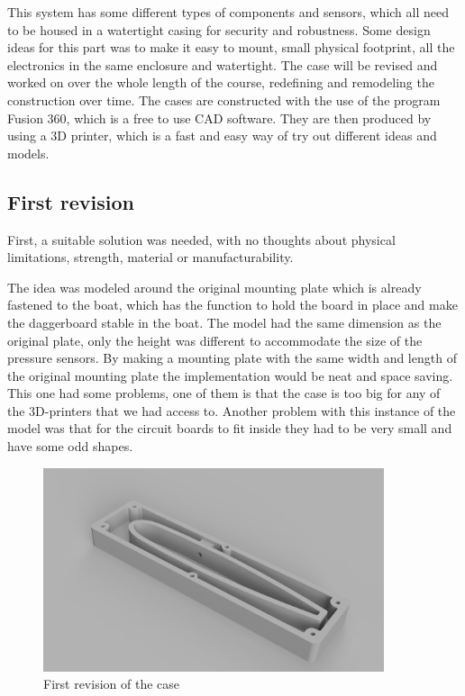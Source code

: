 
This system has some different types of components and sensors, which all need to be housed in a watertight casing for security and robustness. Some design ideas for this part was to make it easy to mount, small physical footprint, all the electronics in the same enclosure and watertight.  
The case will be revised and worked on over the whole length of the course, redefining and remodeling the construction over time.  
The cases are constructed with the use of the program Fusion 360, which is a free to use CAD software. They are then produced by using a 3D printer, which is a fast and easy way of try out different ideas and models.   

\subsection{First revision}
First, a suitable solution was needed, with no thoughts about physical limitations, strength, material or manufacturability.  

The idea was modeled around the original mounting plate which is already fastened to the boat, which has the function to hold the board in place and make the daggerboard stable in the boat. The model had the same dimension as the original plate, only the height was different to accommodate the size of the pressure sensors. By making a mounting plate with the same width and length of the original mounting plate the implementation would be neat and space saving. 
This one had some problems, one of them is that the case is too big for any of the 3D-printers that we had access to. Another problem with this instance of the model was that for the circuit boards to fit inside they had to be very small and have some odd shapes.  



\begin{figure}[H]
\begin{center}
	\includegraphics[width = 10cm]{Figures/Case_rev_1.png}
	\caption{First revision of the case}
	\label{Case_rev_1}
\end{center}
\end{figure}

